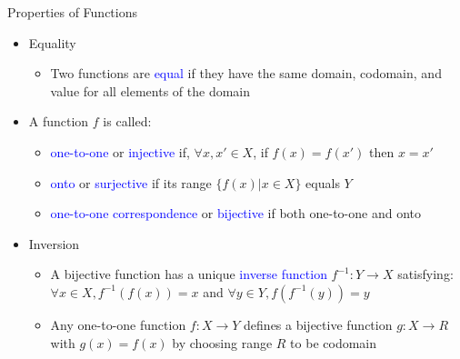 \documentclass[10pt,english]{beamer}
\begin{document}
\begin{frame}{Properties of Functions}

\begin{itemize}
\setlength\itemsep{3mm}
\item<1-> Equality \vspace{1mm}
\begin{itemize}
  \setlength\itemsep{1.5mm}
  \item Two functions are \textcolor{blue}{equal} if they have the same domain, codomain, and value for all elements of the domain
\end{itemize}

\item<2-> A function $f$ is called: \vspace{1mm}
\begin{itemize}
  \setlength\itemsep{1.5mm}
  \item \textcolor{blue}{one-to-one} or \textcolor{blue}{injective} if, $\forall x,x'\in X$, if $f(x)=f(x')$ then $x=x'$
  \item \textcolor{blue}{onto} or \textcolor{blue}{surjective} if its range $\{ f(x) | x\in X\}$ equals $Y$
  \item \textcolor{blue}{one-to-one correspondence} or \textcolor{blue}{bijective} if both one-to-one and onto
\end{itemize}

\item<3-> Inversion \vspace{1mm}
\begin{itemize}
  \setlength\itemsep{1.5mm}
  \item A bijective function has a unique \textcolor{blue}{inverse function} $f^{-1} \colon Y\rightarrow X$ satisfying: $\forall x\in X, f^{-1}(f(x)) = x$ and $\forall y\in Y, f(f^{-1}(y)) = y$
  \item Any one-to-one function $f \colon X\rightarrow Y$ defines a bijective function $g \colon X \rightarrow R$ with $g(x)=f(x)$ by choosing range $R$ to be codomain

\end{itemize}

\end{itemize}
\end{frame}    
\end{document}

